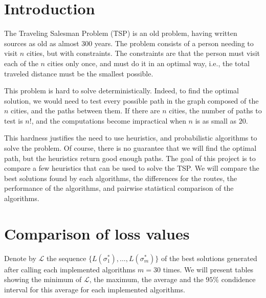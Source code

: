 \documentclass[a4paper, 11pt]{scrartcl}
\title{\vspace{-1cm}\normalfont{\bfseries{Probabilistic Algorithms Project \\ {\Large Comparing heuristics for
      TSP}}}}
\author{Laurent \textsc{Hayez}}
\date{\today}%
\begin{document}
\renewcommand{\labelitemi}{\textbullet}

\maketitle

\thispagestyle{fancy}



\section{Introduction}

The Traveling Salesman Problem (TSP) is an old problem, having written sources as old as almost 300 years. The
problem consists of a person needing to visit $n$ cities, but with constraints. The constraints are that the
person must visit each of the $n$ cities only once, and must do it in an optimal way, i.e., the total
traveled distance must be the smallest possible.

This problem is hard to solve deterministically. Indeed, to find the optimal solution, we would need to test
every possible path in the graph composed of the $n$ cities, and the paths between them. If there are $n$
cities, the number of paths to test is $n!$, and the computations become impractical when $n$ is as small as
$20$. 

This hardness justifies the need to use heuristics, and probabilistic algorithms to solve the problem. Of
course, there is no guarantee that we will find the optimal path, but the heuristics return good enough
paths. The goal of this project is to compare a few heuristics that can be used to solve the TSP. We will
compare the best solutions found by each algorithms, the differences for the routes, the performance of the
algorithms, and pairwise statistical comparison of the algorithms. 

\section{Comparison of loss values}

Denote by $\mathcal{L}$ the sequence $\{L(\sigma_1^{\ast}), \ldots, L(\sigma_m^{\ast})\}$ of the best
solutions generated after calling each implemented algorithms $m = 30$ times. We will present tables showing
the minimum of $\mathcal{L}$, the maximum, the average and the $95\%$ condidence interval for this average for
each implemented algorithms.




	
\end{document}
